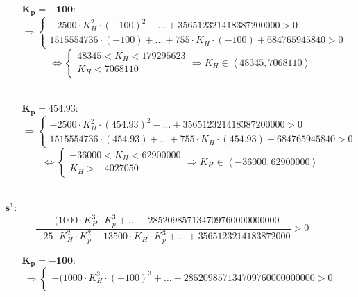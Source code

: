 \documentclass[a4paper,12pt]{article}
\begin{document}
\begin{itemize}
\begin{itemize}
                \item[$\mathbf{K_p = -100 :}$] \[ \Rightarrow \begin{cases}
                            -2500 \cdot K_H^2 \cdot (-100)^2 -  \dots + 356512321418387200000 > 0 \\
                            1515554736 \cdot (-100) + \dots + 755 \cdot K_H \cdot (-100) + 684765945840 > 0
                    \end{cases} \] \begin{equation}
                        \Leftrightarrow \begin{cases}
                        48345 < K_H < 179295623 \\
                        K_H < 7068110
                    \end{cases} \Rightarrow \boxed{K_H \in \left< 48345, 7068110 \right>} \end{equation} \\
                \item[$\mathbf{K_p = 454.93 :}$] \[ \Rightarrow \begin{cases}
                        -2500 \cdot K_H^2 \cdot (454.93)^2 -  \dots + 356512321418387200000 > 0 \\
                        1515554736 \cdot (454.93) + \dots + 755 \cdot K_H \cdot (454.93) + 684765945840 > 0
                    \end{cases} \] \begin{equation}
                        \Leftrightarrow \begin{cases}
                        -36000 < K_H < 62900000 \\
                        K_H > -4027050
                    \end{cases} \Rightarrow \boxed{K_H \in \left< -36000, 62900000 \right>} \end{equation} \\
            \end{itemize}
        \item[$\mathbf{s^1 :}$] \[
                \frac{-(1000 \cdot K_H^3 \cdot K_p^3 + \dots - 285209857134709760000000000}{-25 \cdot K_H^2 \cdot K_p^2 - 13500 \cdot K_H \cdot K_p^3 + \dots + 3565123214183872000} > 0
            \]\begin{itemize}
                \item[$\mathbf{K_p = -100 :}$] \[ \Rightarrow \begin{cases}
                            -(1000 \cdot K_H^3 \cdot (-100)^3 + \dots - 285209857134709760000000000 > 0 \\

\end{cases}\]
\end{itemize}
\end{itemize}
\end{document}
